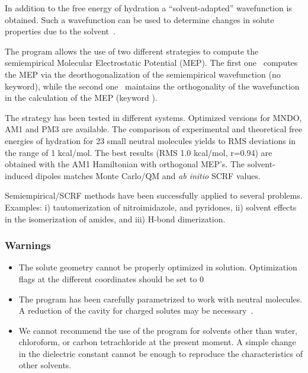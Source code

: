 In addition to the free energy of hydration a ``solvent-adapted'' wavefunction 
is obtained. Such a wavefunction can be used to determine changes in  solute
properties due to the solvent~\cite{lobg,lo,lo2,lobg2}.


The program allows the use of two different strategies to compute the 
semiempirical Molecular Electrostatic Potential (MEP). The first 
one~\cite{lio,alo,lo3} computes the MEP via the deorthogonalization of the
semiempirical  wavefunction (no keyword), while the second one~\cite{frr,alo2}
maintains the  orthogonality of the wavefunction in the calculation of the MEP
(keyword ). \label{ort}

The strategy has been tested in different systems. Optimized versions for 
MNDO, AM1 and PM3 are available. The comparison of experimental and 
theoretical free energies of hydration for 23 small neutral molecules yields
to  RMS deviations in the range of 1  kcal/mol. The best results  (RMS 1.0
kcal/mol, r=0.94) are obtained with the AM1 Hamiltonian with  orthogonal MEP's.
The solvent-induced dipoles matches Monte Carlo/QM and {\em ab initio} SCRF
values.

Semiempirical/SCRF methods have been successfully applied to several problems. 
Examples: i) tautomerization of nitroimidazole, and pyridones, ii) solvent 
effects in the isomerization of amides, and iii) H-bond dimerization.

\subsubsection*{Warnings}
\begin{itemize}
\item The solute geometry cannot be properly optimized in solution.
Optimization flags  at the different coordinates should be set to 0

\item The program has been carefully parametrized to work with neutral
molecules.  A reduction of the cavity for charged solutes may be
necessary~\cite{ol}.

\item We cannot recommend the use of the program for solvents other than 
water, chloroform, or carbon tetrachloride at the present moment. A simple 
change in the dielectric constant cannot  be enough to reproduce the
characteristics of other solvents.
\end{itemize}

